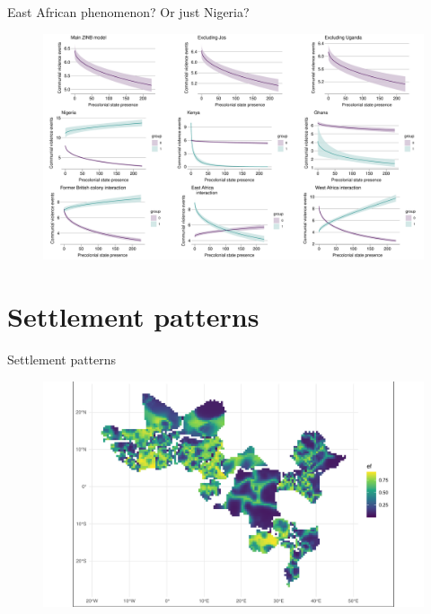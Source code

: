 \documentclass{beamer}
\begin{document}
\begin{frame}{East African phenomenon? Or just Nigeria?}

	\begin{figure}[htpb]
		\centering
		\includegraphics[width=\linewidth]{img/acledplots.pdf}
	\end{figure}	

\end{frame}
\section{Settlement patterns}

\begin{frame}{Settlement patterns}

	\begin{figure}[htpb]
		\centering
		\includegraphics[width=\linewidth]{img/ethplot.pdf}
	\end{figure}

\end{frame}
\end{document}
